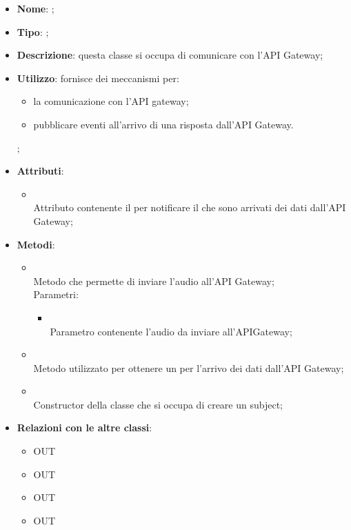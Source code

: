 \begin{itemize}
	\item \textbf{Nome}: ;
	\item \textbf{Tipo}: ;
	\item \textbf{Descrizione}: questa classe si occupa di comunicare con l'API Gateway;
	\item \textbf{Utilizzo}: fornisce dei meccanismi per:
\begin{itemize}
\item la comunicazione con l'API gateway;
\item pubblicare eventi all'arrivo di una risposta dall'API Gateway.
\end{itemize};
	\item \textbf{Attributi}:
	\begin{itemize}
		\item[]  \\
		Attributo contenente il  per notificare il  che sono arrivati dei dati dall'API Gateway;
	\end{itemize}
	\item \textbf{Metodi}:
	\begin{itemize}
		\item[]  \\
		Metodo che permette di inviare l'audio all'API Gateway;\\
		Parametri:
		\begin{itemize}
			\item {} \\
			Parametro contenente l'audio da inviare all'APIGateway;
		\end{itemize}
		\item[]  \\
		Metodo utilizzato per ottenere un  per l'arrivo dei dati dall'API Gateway;\\
		\item[]  \\
		Constructor della classe  che si occupa di creare un subject;\\
	\end{itemize}
	\item \textbf{Relazioni con le altre classi}:
	\begin{itemize}
		\item OUT \hyperlink{HttpError_label}{}
		\item OUT \hyperlink{DataArrivedSubject_label}{}
		\item OUT \hyperlink{DataArrivedObservable_label}{}
		\item OUT \hyperlink{HttpPromise_label}{}
	\end{itemize}
\end{itemize}
\FloatBarrier

